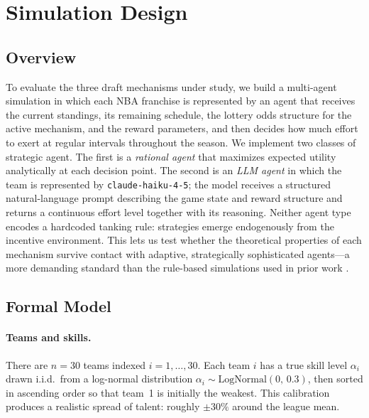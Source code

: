 
\section{Simulation Design}

\subsection{Overview}

To evaluate the three draft mechanisms under study, we build a multi-agent
simulation in which each NBA franchise is represented by an agent that receives
the current standings, its remaining schedule, the lottery odds structure for
the active mechanism, and the reward parameters, and then decides how much
effort to exert at regular intervals throughout the season.
We implement two classes of strategic agent.
The first is a \emph{rational agent} that maximizes expected utility analytically
at each decision point.
The second is an \emph{LLM agent} in which the team is represented by
\texttt{claude-haiku-4-5}; the model receives a structured natural-language
prompt describing the game state and reward structure and returns a continuous
effort level together with its reasoning.
Neither agent type encodes a hardcoded tanking rule: strategies emerge
endogenously from the incentive environment.
This lets us test whether the theoretical properties of each mechanism survive
contact with adaptive, strategically sophisticated agents---a more demanding
standard than the rule-based simulations used in prior work
\citep{kazachkov2020, highley2026}.

\subsection{Formal Model}

\paragraph{Teams and skills.}
There are $n = 30$ teams indexed $i = 1, \ldots, 30$.
Each team $i$ has a true skill level $\alpha_i$ drawn i.i.d.\ from a
log-normal distribution $\alpha_i \sim \text{LogNormal}(0,\, 0.3)$,
then sorted in ascending order so that team~1 is initially the weakest.
This calibration produces a realistic spread of talent: roughly $\pm 30\%$
around the league mean.

